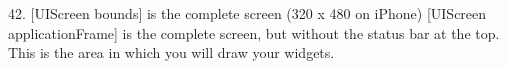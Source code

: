 42. [UIScreen bounds] is the complete screen (320 x 480 on iPhone)
       [UIScreen applicationFrame] is the complete screen, but without the status bar at the top. This is the area in which you will draw your widgets.